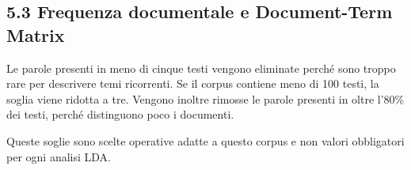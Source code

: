 \documentclass[
]{article}
\newenvironment{Shaded}{\begin{snugshade}}{\end{snugshade}}
\newcommand{\AttributeTok}[1]{\textcolor[rgb]{0.13,0.29,0.53}{#1}}
\newcommand{\DecValTok}[1]{\textcolor[rgb]{0.00,0.00,0.81}{#1}}
\newcommand{\FunctionTok}[1]{\textcolor[rgb]{0.13,0.29,0.53}{\textbf{#1}}}
\newcommand{\NormalTok}[1]{#1}
\newcommand{\OtherTok}[1]{\textcolor[rgb]{0.56,0.35,0.01}{#1}}
\newcommand{\SpecialCharTok}[1]{\textcolor[rgb]{0.81,0.36,0.00}{\textbf{#1}}}
\newcommand{\StringTok}[1]{\textcolor[rgb]{0.31,0.60,0.02}{#1}}
\begin{document}
\begin{Shaded}
\end{Shaded}

\subsection{5.3 Frequenza documentale e Document-Term
Matrix}\label{frequenza-documentale-e-document-term-matrix}

Le parole presenti in meno di cinque testi vengono eliminate perché sono
troppo rare per descrivere temi ricorrenti. Se il corpus contiene meno
di 100 testi, la soglia viene ridotta a tre. Vengono inoltre rimosse le
parole presenti in oltre l'80\% dei testi, perché distinguono poco i
documenti.

Queste soglie sono scelte operative adatte a questo corpus e non valori
obbligatori per ogni analisi LDA.
\end{document}
